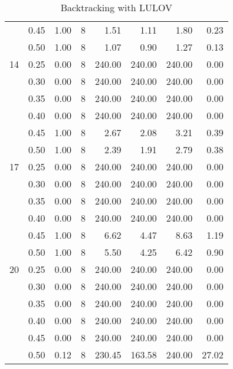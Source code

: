 \documentclass[11pt]{article}
\begin{document}
\begin{table}
\begin{tabular}{llrrrrrr}
    & 0.45 &           1.00 &              8 &   1.51 &   1.11 &   1.80 &      0.23 \\
    & 0.50 &           1.00 &              8 &   1.07 &   0.90 &   1.27 &      0.13 \\
    \midrule
    14 & 0.25 &           0.00 &              8 & 240.00 & 240.00 & 240.00 &      0.00 \\
    & 0.30 &           0.00 &              8 & 240.00 & 240.00 & 240.00 &      0.00 \\
    & 0.35 &           0.00 &              8 & 240.00 & 240.00 & 240.00 &      0.00 \\
    & 0.40 &           0.00 &              8 & 240.00 & 240.00 & 240.00 &      0.00 \\
    & 0.45 &           1.00 &              8 &   2.67 &   2.08 &   3.21 &      0.39 \\
    & 0.50 &           1.00 &              8 &   2.39 &   1.91 &   2.79 &      0.38 \\
    \midrule
    17 & 0.25 &           0.00 &              8 & 240.00 & 240.00 & 240.00 &      0.00 \\
    & 0.30 &           0.00 &              8 & 240.00 & 240.00 & 240.00 &      0.00 \\
    & 0.35 &           0.00 &              8 & 240.00 & 240.00 & 240.00 &      0.00 \\
    & 0.40 &           0.00 &              8 & 240.00 & 240.00 & 240.00 &      0.00 \\
    & 0.45 &           1.00 &              8 &   6.62 &   4.47 &   8.63 &      1.19 \\
    & 0.50 &           1.00 &              8 &   5.50 &   4.25 &   6.42 &      0.90 \\
    \midrule
    20 & 0.25 &           0.00 &              8 & 240.00 & 240.00 & 240.00 &      0.00 \\
    & 0.30 &           0.00 &              8 & 240.00 & 240.00 & 240.00 &      0.00 \\
    & 0.35 &           0.00 &              8 & 240.00 & 240.00 & 240.00 &      0.00 \\
    & 0.40 &           0.00 &              8 & 240.00 & 240.00 & 240.00 &      0.00 \\
    & 0.45 &           0.00 &              8 & 240.00 & 240.00 & 240.00 &      0.00 \\
    & 0.50 &           0.12 &              8 & 230.45 & 163.58 & 240.00 &     27.02 \\
    \bottomrule
  \end{tabular}
  \caption{Backtracking with LULOV}\label{tab:LU}
\end{table}
\end{document}
